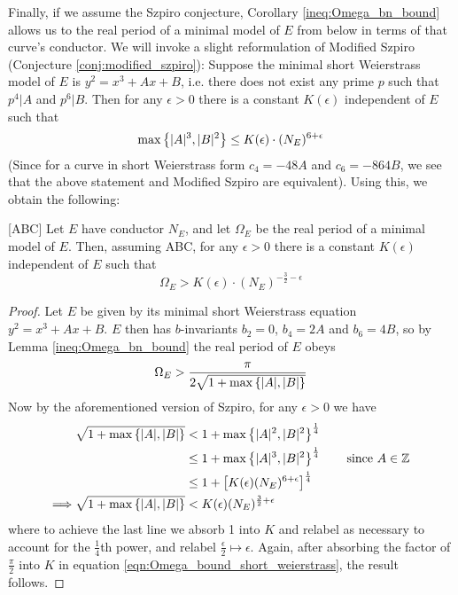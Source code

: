 Finally, if we assume the Szpiro conjecture, Corollary \ref{ineq:Omega_bn_bound} allows us to the real period of a minimal model of $E$ from below in terms of that curve's conductor. We will invoke a slight reformulation of Modified Szpiro (Conjecture \ref{conj:modified_szpiro}): Suppose the minimal short Weierstrass model of $E$ is $y^2 = x^3+Ax+B$, i.e. there does not exist any prime $p$ such that $p^4|A$ and $p^6|B$. Then for any $\epsilon>0$ there is a constant $K(\epsilon)$ independent of $E$ such that
\begin{equation}
\max\left\{|A|^3,|B|^2\right\} \le K(\epsilon)\cdot (N_E)^{6+\epsilon}
\end{equation}
(Since for a curve in short Weierstrass form $c_4 = -48A$ and $c_6=-864B$, we see that the above statement and Modified Szpiro are equivalent). Using this, we obtain the following:
\begin{theorem}\label{thm:real_period_lower_bound}[ABC]
Let $E$ have conductor $N_E$, and let $\Omega_E$ be the real period of a minimal model of $E$. Then, assuming ABC, for any $\epsilon>0$ there is a constant $K(\epsilon)$ independent of $E$ such that 
\begin{equation}
\Omega_E > K(\epsilon) \cdot (N_E)^{-\frac{3}{2}-\epsilon}
\end{equation}
\end{theorem}
\begin{proof}
Let $E$ be given by its minimal short Weierstrass equation $y^2 = x^3+Ax+B$. $E$ then has $b$-invariants $b_2=0$, $b_4 = 2A$ and $b_6 = 4B$, so by Lemma \ref{ineq:Omega_bn_bound} the real period of $E$ obeys
\begin{equation}\label{eqn:Omega_bound_short_weierstrass}
\Omega_E > \frac{\pi}{2\sqrt{1+\max\left\{|A|,|B|\right\}}}
\end{equation}
Now by the aforementioned version of Szpiro, for any $\epsilon>0$ we have
\begin{align*}
\sqrt{1+\max\left\{|A|,|B|\right\}} &<  1 + \max\left\{|A|^2,|B|^2\right\}^\frac{1}{4} \\
&\le 1 + \max\left\{|A|^3,|B|^2\right\}^\frac{1}{4} \quad\quad\mbox{since $A \in \mathbb{Z}$} \\
&\le 1 +\left[K(\epsilon) (N_E)^{6+\epsilon} \right]^\frac{1}{4} \\
\Longrightarrow \sqrt{1+\max\left\{|A|,|B|\right\}} &< K(\epsilon) (N_E)^{\frac{3}{2}+\epsilon}
\end{align*}
where to achieve the last line we absorb 1 into $K$ and relabel as necessary to account for the $\frac{1}{4}$th power, and relabel $\frac{\epsilon}{2} \mapsto \epsilon$. Again, after absorbing the factor of $\frac{\pi}{2}$ into $K$ in equation \ref{eqn:Omega_bound_short_weierstrass}, the result follows.
\end{proof}

